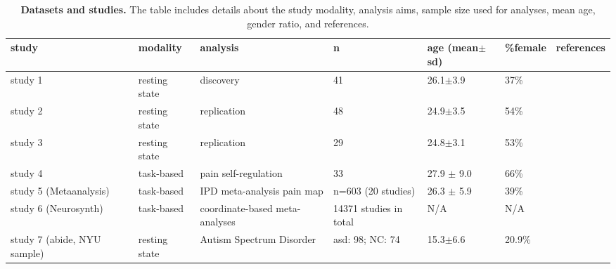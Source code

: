 \documentclass{article}
\begin{document}
\begin{table}
\centering
\caption[]{\textbf{Datasets and studies.} The table includes details about the study modality, analysis aims, sample size used for analyses, mean age, gender ratio, and references.}
\label{tab-samples}
\begin{tabular}{p{}p{}p{}p{}p{}p{}p{}}
\toprule
study & modality & analysis & n & age (mean$\pm$sd) & \%female & references \\
\hline
study 1 & resting state & discovery & 41 & 26.1$\pm$3.9 & 37\% & \cite{Spisak2020Pain} \\
study 2 & resting state & replication & 48 & 24.9$\pm$3.5 & 54\% & \cite{Spisak2020Pain} \\
study 3 & resting state & replication & 29 & 24.8$\pm$3.1 & 53\% & \cite{Spisak2020Pain} \\
study 4 & task-based & pain self-regulation & 33 & 27.9 $\pm$ 9.0 & 66\% & \cite{Woo_2015} \\
study 5 (Metaanalysis) & task-based & IPD meta-analysis pain map & n=603 (20 studies) & 26.3 $\pm$ 5.9 & 39\% & \cite{zunhammer2021meta} \\
study 6 (Neurosynth) & task-based & coordinate-based meta-analyses & 14371 studies in total & N/A & N/A & \cite{Yarkoni_2011} \\
study 7 (\acrshort{abide}, NYU sample) & resting state & Autism Spectrum Disorder & \acrshort{asd}: 98; NC: 74 & 15.3$\pm$6.6 & 20.9\% & \cite{di2014autism} \\
\bottomrule
\end{tabular}
\end{table}
\end{document}
